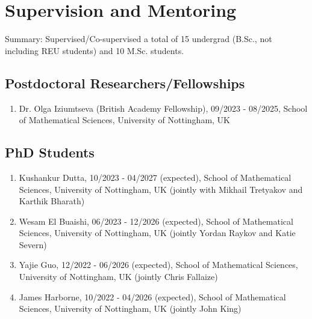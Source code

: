 \documentclass[11pt,a4paper,sans]{moderncv}        %
\begin{document}
%



\section{Supervision and Mentoring}
Summary: Supervised/Co-supervised a total of 15 undergrad (B.Sc., not including REU students)  and 10 M.Sc. students. \\ 

\subsection{Postdoctoral Researchers/Fellowships}
\begin{enumerate}
	\item Dr. Olga Iziumtseva (British Academy Fellowship), 09/2023 - 08/2025, School of Mathematical Sciences, University of Nottingham, UK
\end{enumerate}

\subsection{PhD Students}
\begin{enumerate}
	\item Kushankur Dutta, 10/2023 - 04/2027 (expected), School of Mathematical Sciences, University of Nottingham, UK (jointly with Mikhail Tretyakov and Karthik Bharath)
	\item Wesam El Buaishi, 06/2023 - 12/2026 (expected), School of Mathematical Sciences, University of Nottingham, UK (jointly Yordan Raykov and Katie Severn)
	\item Yajie Guo, 12/2022 - 06/2026 (expected), School of Mathematical Sciences, University of Nottingham, UK (jointly Chris Fallaize)
	\item James Harborne, 10/2022 - 04/2026 (expected), School of Mathematical Sciences, University of Nottingham, UK (jointly John King)
\end{enumerate}

\end{document}
